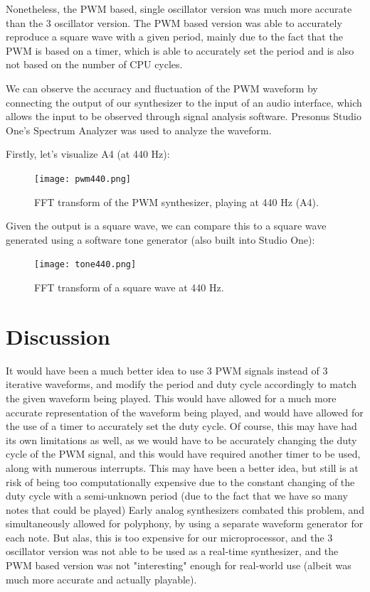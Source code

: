 \documentclass[12pt]{article}
\begin{document}
Nonetheless, the PWM based, single oscillator version was much more accurate than the 3 oscillator version.
The PWM based version was able to accurately reproduce a square wave with a given period, mainly due to the fact that the PWM is based on a timer, which is able to accurately set the period and is also not based on the number of CPU cycles.

We can observe the accuracy and fluctuation of the PWM waveform by connecting the output of our synthesizer to the input of an audio interface, which allows the input to be observed through signal analysis software. Presonus Studio One's Spectrum Analyzer was used to analyze the waveform. 

Firstly, let's visualize A4 (at 440 Hz):

\begin{figure}[H]
    \centering
    \texttt{[image: pwm440.png]}
    \caption{FFT transform of the PWM synthesizer, playing at 440 Hz (A4). }
    \label{fig:pwm440}
\end{figure}

Given the output is a square wave, we can compare this to a square wave generated using a software tone generator (also built into Studio One):

\begin{figure}[H]
    \centering
    \texttt{[image: tone440.png]}
    \caption{FFT transform of a square wave at 440 Hz. }
    \label{fig:tone440}
\end{figure}



\section{Discussion}\label{sec:discussion}


It would have been a much better idea to use 3 PWM signals instead of 3 iterative waveforms, and modify the period and duty cycle accordingly to match the given waveform being played.
This would have allowed for a much more accurate representation of the waveform being played, and would have allowed for the use of a timer to accurately set the duty cycle.
Of course, this may have had its own limitations as well, as we would have to be accurately changing the duty cycle of the PWM signal, and this would have required another timer to be used, along with numerous interrupts.
This may have been a better idea, but still is at risk of being too computationally expensive due to the constant changing of the duty cycle with a semi-unknown period (due to the fact that we have so many notes that could be played)
Early analog synthesizers combated this problem, and simultaneously allowed for polyphony, by using a separate waveform generator for each note.
But alas, this is too expensive for our microprocessor, and the 3 oscillator version was not able to be used as a real-time synthesizer, and the PWM based version was not "interesting" enough for real-world use (albeit was much more accurate and actually playable).
\end{document}
